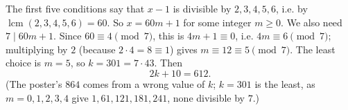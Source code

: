 The first five conditions say that $x-1$ is divisible by $2,3,4,5,6$, i.e. by $\operatorname{lcm}(2,3,4,5,6)=60$. So $x=60m+1$ for some integer $m\ge0$. We also need $7\mid 60m+1$. Since $60\equiv4\pmod7$, this is $4m+1\equiv0$, i.e. $4m\equiv6\pmod7$; multiplying by $2$ (because $2\cdot4=8\equiv1$) gives $m\equiv12\equiv5\pmod7$. The least choice is $m=5$, so $k=301=7\cdot43$. Then
\[
2k+10=\boxed{612}.
\]
(The poster's $864$ comes from a wrong value of $k$; $k=301$ is the least, as $m=0,1,2,3,4$ give $1,61,121,181,241$, none divisible by $7$.)
